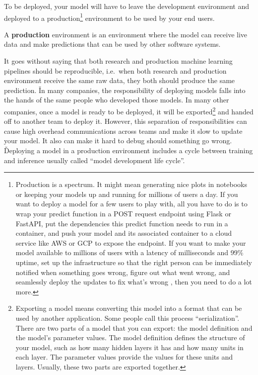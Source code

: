 To be deployed, your model will have to leave the development environment and deployed to a production\footnote{
Production is a spectrum. It might mean generating nice plots in notebooks or keeping your models up and running for
millions of users a day. If you want to deploy a model for a few users to play with, all you have to do is to wrap
your predict function in a POST request endpoint using Flask or FastAPI, put the dependencies this predict function
needs to run in a container, and push your model and its associated container to a cloud service like AWS or GCP to
expose the endpoint. If you want to make your model available to millions of users with a latency of milliseconds and
99\% uptime, set up the infrastructure so that the right person can be immediately notified when something goes wrong,
figure out what went wrong, and seamlessly deploy the updates to fix what's wrong , then you need to do a lot more.}
environment to be used by your end users.

A \textbf{production} environment is an environment where the model can receive live data and make predictions that can
be used by other software systems.
\ed

It goes without saying that both research and production machine learning pipelines should be reproducible, i.e.\ when
both research and production environment receive the same raw data, they both should produce the same prediction. \v

In many companies, the responsibility of deploying models falls into the hands of the same people who developed those
models. In many other companies, once a model is ready to be deployed, it will be exported\footnote{Exporting a model
means converting this model into a format that can be used by another application. Some people call this process
``serialization''. There are two parts of a model that you can export: the model definition and the model's parameter
values. The model definition defines the structure of your model, such as how many hidden layers it has and how many
units in each layer. The parameter values provide the values for these units and layers. Usually, these two parts are
exported together.} and handed off to another team to deploy it. However, this separation of responsibilities can
cause high overhead communications across teams and make it slow to update your model. It also can make it hard to
debug should something go wrong. \v

Deploying a model in a production environment includes a cycle between training and inference usually called ``model
development life cycle''.

